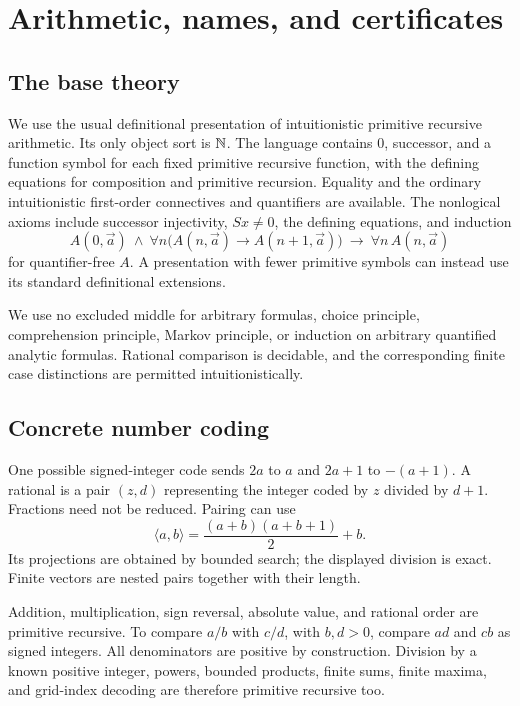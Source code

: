 \section{Arithmetic, names, and certificates}\label{sec:arithmetic}

\subsection{The base theory}

We use the usual definitional presentation of intuitionistic primitive
recursive arithmetic. Its only object sort is $\mathbb N$. The language contains
$0$, successor, and a function symbol for each fixed primitive recursive
function, with the defining equations for composition and primitive
recursion. Equality and the ordinary intuitionistic first-order connectives
and quantifiers are available. The nonlogical axioms include successor
injectivity, $Sx\ne0$, the defining equations, and induction
\[
 A(0,\vec a)\ \wedge\
 \forall n\bigl(A(n,\vec a)\to A(n+1,\vec a)\bigr)
 \ \longrightarrow\ \forall n\,A(n,\vec a)
\]
for quantifier-free $A$. A presentation with fewer primitive symbols can
instead use its standard definitional extensions.

We use no excluded middle for arbitrary formulas, choice principle,
comprehension principle, Markov principle, or induction on arbitrary
quantified analytic formulas. Rational comparison is decidable, and the
corresponding finite case distinctions are permitted intuitionistically.

\subsection{Concrete number coding}

One possible signed-integer code sends $2a$ to $a$ and $2a+1$ to $-(a+1)$.
A rational is a pair $(z,d)$ representing the integer coded by $z$ divided
by $d+1$. Fractions need not be reduced. Pairing can use
\[
 \langle a,b\rangle=\frac{(a+b)(a+b+1)}2+b.
\]
Its projections are obtained by bounded search; the displayed division is
exact. Finite vectors are nested pairs together with their length.

Addition, multiplication, sign reversal, absolute value, and rational order
are primitive recursive. To compare $a/b$ with $c/d$, with $b,d>0$, compare
$ad$ and $cb$ as signed integers. All denominators are positive by
construction. Division by a known positive integer, powers, bounded
products, finite sums, finite maxima, and grid-index decoding are therefore
primitive recursive too.

